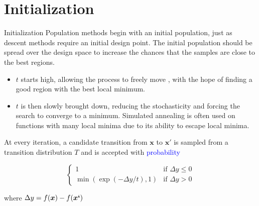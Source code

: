 \documentclass{beamer}
\begin{document}
\section{Initialization}
\begin{frame}{Initialization}
Population methods begin with an initial population, just as descent methods require an initial design point. The initial population should be spread over the design space to increase the chances that the samples are close to the best regions. 
\begin{itemize}
    \item $t$ starts high, allowing the process to freely move , with the hope of finding a good region with the best local minimum. 
    \item $t$ is then slowly brought down, reducing the stochasticity and forcing the search to converge to a minimum. Simulated annealing is often used on functions with many local minima due to its ability to escape local minima.
    
\end{itemize}


At every iteration, a candidate transition from $\boldsymbol{x}$ to $\boldsymbol{x}′$ is sampled from a transition distribution $T$ and is accepted with \textcolor{blue}{probability}

\begin{equation*}
\begin{cases}
1 & \textrm{if } \Delta y \leq 0\\
\min(\exp(-\Delta y/t), 1) & \textrm{if }\Delta y >0
\end{cases}
\end{equation*}

where $\Delta y = f(\boldsymbol{x})- f(\boldsymbol{x`})$

\end{frame}
\end{document}
